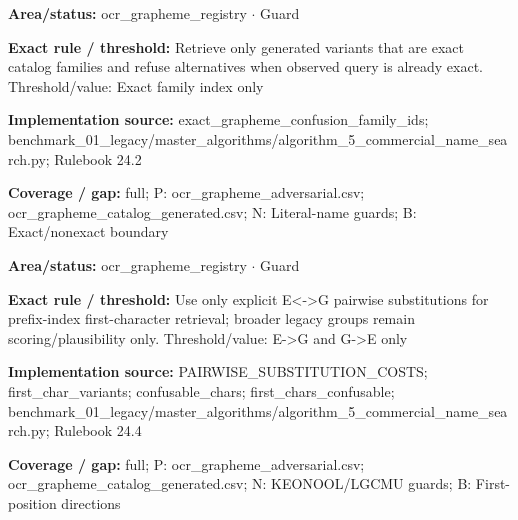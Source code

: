 \begin{tcolorbox}[enhanced,breakable,colback=white,colframe=Muted!45,boxrule=0.45pt,arc=1.5pt,left=6pt,right=6pt,top=5pt,bottom=5pt,title={\texttt{OCR-EXACT-RETRIEVAL-14}},title after break={\texttt{OCR-EXACT-RETRIEVAL-14}\ (continued)},fonttitle=\headingfont\bfseries\color{Navy},coltitle=Navy]
\textbf{Area/status:} ocr\_\allowbreak{}grapheme\_\allowbreak{}registry $\boldsymbol{\cdot}$ Guard\par
\smallskip
\textbf{Exact rule / threshold:} Retrieve only generated variants that are exact catalog families and refuse alternatives when observed query is already exact. Threshold/\allowbreak{}value: Exact family index only\par
\smallskip
\textbf{Implementation source:} exact\_\allowbreak{}grapheme\_\allowbreak{}confusion\_\allowbreak{}family\_\allowbreak{}ids; benchmark\_\allowbreak{}01\_\allowbreak{}legacy/\allowbreak{}master\_\allowbreak{}algorithms/\allowbreak{}algorithm\_\allowbreak{}5\_\allowbreak{}commercial\_\allowbreak{}name\_\allowbreak{}search.py; Rulebook 24.2\par
\smallskip
\textbf{Coverage / gap:} full; P: ocr\_\allowbreak{}grapheme\_\allowbreak{}adversarial.csv; ocr\_\allowbreak{}grapheme\_\allowbreak{}catalog\_\allowbreak{}generated.csv; N: Literal-name guards; B: Exact/\allowbreak{}nonexact boundary
\end{tcolorbox}
\begin{tcolorbox}[enhanced,breakable,colback=white,colframe=Muted!45,boxrule=0.45pt,arc=1.5pt,left=6pt,right=6pt,top=5pt,bottom=5pt,title={\texttt{OCR-FIRST-CHAR-18}},title after break={\texttt{OCR-FIRST-CHAR-18}\ (continued)},fonttitle=\headingfont\bfseries\color{Navy},coltitle=Navy]
\textbf{Area/status:} ocr\_\allowbreak{}grapheme\_\allowbreak{}registry $\boldsymbol{\cdot}$ Guard\par
\smallskip
\textbf{Exact rule / threshold:} Use only explicit E<->G pairwise substitutions for prefix-index first-character retrieval; broader legacy groups remain scoring/\allowbreak{}plausibility only. Threshold/\allowbreak{}value: E->G and G->E only\par
\smallskip
\textbf{Implementation source:} PAIRWISE\_\allowbreak{}SUBSTITUTION\_\allowbreak{}COSTS; first\_\allowbreak{}char\_\allowbreak{}variants; confusable\_\allowbreak{}chars; first\_\allowbreak{}chars\_\allowbreak{}confusable; benchmark\_\allowbreak{}01\_\allowbreak{}legacy/\allowbreak{}master\_\allowbreak{}algorithms/\allowbreak{}algorithm\_\allowbreak{}5\_\allowbreak{}commercial\_\allowbreak{}name\_\allowbreak{}search.py; Rulebook 24.4\par
\smallskip
\textbf{Coverage / gap:} full; P: ocr\_\allowbreak{}grapheme\_\allowbreak{}adversarial.csv; ocr\_\allowbreak{}grapheme\_\allowbreak{}catalog\_\allowbreak{}generated.csv; N: KEONOOL/\allowbreak{}LGCMU guards; B: First-position directions
\end{tcolorbox}
